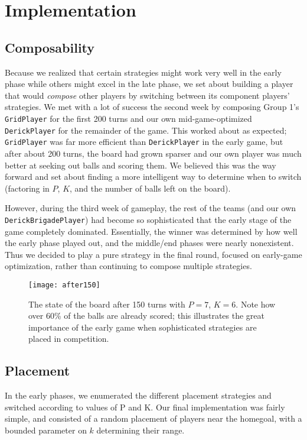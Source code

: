 \documentclass[
10pt, %
letterpaper, %
oneside, %
headinclude,footinclude, %
english
]{article}
\begin{document}
\section{Implementation}

\subsection{Composability}
Because we realized that certain strategies might work very well in the early phase while others might excel in the late phase, we set about building a player that would \textit{compose} other players by switching between its component players' strategies. We met with a lot of success the second week by composing Group 1's \texttt{GridPlayer} for the first 200 turns and our own mid-game-optimized \texttt{DerickPlayer} for the remainder of the game. This worked about as expected; \texttt{GridPlayer} was far more efficient than \texttt{DerickPlayer} in the early game, but after about 200 turns, the board had grown sparser and our own player was much better at seeking out balls and scoring them. We believed this was the way forward and set about finding a more intelligent way to determine when to switch (factoring in $P$, $K$, and the number of balls left on the board).

However, during the third week of gameplay, the rest of the teams (and our own \texttt{DerickBrigadePlayer}) had become so sophisticated that the early stage of the game completely dominated. Essentially, the winner was determined by how well the early phase played out, and the middle/end phases were nearly nonexistent. Thus we decided to play a pure strategy in the final round, focused on early-game optimization, rather than continuing to compose multiple strategies.

\begin{figure}[h!]
\centering
\texttt{[image: after150]}
\caption[State of a parallel football board after 150 turns]{The state of the board after 150 turns with $P=7$, $K=6$. Note how over 60\% of the balls are already scored; this illustrates the great importance of the early game when sophisticated strategies are placed in competition.}
\label{fig:gallery2}
\end{figure}

\subsection{Placement}
In the early phases, we enumerated the different placement strategies and switched according to values of P and K. Our final implementation was fairly simple, and consisted of a random placement of players near the homegoal, with a bounded parameter on $k$ determining their range.
\end{document}
